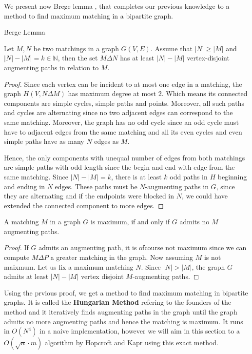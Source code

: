 We present now Brege lemma \cite{berge1957two}, that completes our previous knowledge to a method to find maximum matching in a bipartite graph.
\begin{lemma}Berge Lemma

	Let $M, N$ be two matchings in a graph $G(V, E)$. Assume that $|N| \geq |M|$ and $|N| - |M| = k \in \mathbb{N}$, then the set $M \Delta N$ has at least $|N| - |M|$ vertex-disjoint augmenting paths in relation to $M$.
\end{lemma}
\begin{proof}
	Since each vertex can be incident to at most one edge in a matching, the graph $H(V, N \Delta M)$ has maximum degree at most $2$. Which means its connected components are simple cycles, simple paths and points. Moreover, all such paths and cycles are alternating since no two adjacent edges can correspond to the same matching. Moreover, the graph has no odd cycle since an odd cycle must have to adjacent edges from the same matching and all its even cycles and even simple paths have as many $N$ edges as $M$.

	Hence, the only components with unequal number of edges from both matchings are simple paths with odd length since the begin and end with edge from the same matching. Since $|N| - |M| = k$, there is at least $k$ odd paths in $H$ beginning and ending in $N$ edges. These paths must be $N$-augmenting paths in $G$, since they are alternating and if the endpoints were blocked in $N$, we could have extended the connected component to more edges.
\end{proof}
\begin{corollary}
	A matching $M$ in a graph $G$ is maximum, if and only if $G$ admits no $M$ augmenting paths.
\end{corollary}
\begin{proof}
If $G$ admits an augmenting path, it is ofcourse not maximum since we can compute $M \Delta P$ a greater matching in the graph.
Now assuming $M$ is not maixmum. Let us fix a maximum matching $N$. Since $|N| > |M|$, the graph $G$ admits at least $|N| - |M|$ vertex disjoint $M$-augmenting paths.
\end{proof}

Using the prvious proof, we get a method to find maximum matching in bipartite graphs. It is called the \textbf{Hungarian Method} refering to the founders of the method and it iteratively finds augmenting paths in the graph until the graph admits no more augmenting paths and hence the matching is maximum. It runs in $O(N^4)$ in a naive implementation, however we will aim in this section to a $O(\sqrt n \cdot m)$ algorithm by Hopcroft and Kapr using this exact method.

